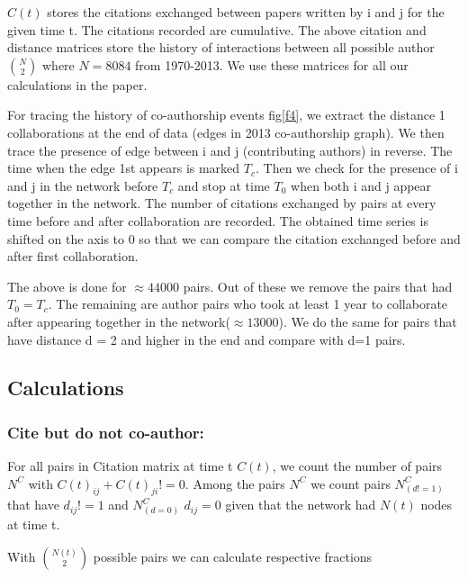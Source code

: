 \documentclass[aps, pre, twocolumn, nofootinbib]{revtex4-1}
\begin{document}
$C(t)$ stores the citations exchanged between papers written by i and j for the given time t. The citations recorded are cumulative. The above citation and distance matrices store the history of interactions between all possible author  $\binom{N}{2}$ where $N = 8084$ from 1970-2013. We use these matrices for all our calculations in the paper.

For tracing the history of co-authorship events fig\ref{f4}, we extract the distance 1 collaborations at the end of data (edges in 2013 co-authorship graph). We then trace the presence of edge between i and j (contributing authors) in reverse. The time when the edge 1st appears is marked $T_c$. Then we check for the presence of i and j in the network before $T_c$ and stop at time $T_0$ when both i and j appear together in the network. The number of citations exchanged by pairs at every time before and after collaboration are recorded. The obtained time series is shifted on the axis to 0 so that we can compare the citation exchanged before and after first collaboration.

The above is done for $\approx 44000$ pairs. Out of these we remove the pairs that had $T_0 = T_c$. The remaining are author pairs who took at least 1 year to collaborate after appearing together in the network($\approx 13000$).  We do the same for pairs that have distance d = 2 and higher in the end and compare with d=1 pairs. 

\subsection{Calculations}

\subsubsection{Cite but do not co-author:} 
For all pairs in Citation matrix at time t $C(t)$, we count the number of pairs $N^C$ with $C(t)_{ij} + C(t)_{ji} != 0$. Among the pairs $N^C$ we count pairs $N^C_{(d!=1)}$ that have $d_{ij} != 1$ and $N^C_{(d=0)}$ $d_{ij} = 0$ given that the network had $N(t)$ nodes at time t.

With $\binom{N(t)}{2}$ possible pairs we can calculate respective fractions 
\end{document}
